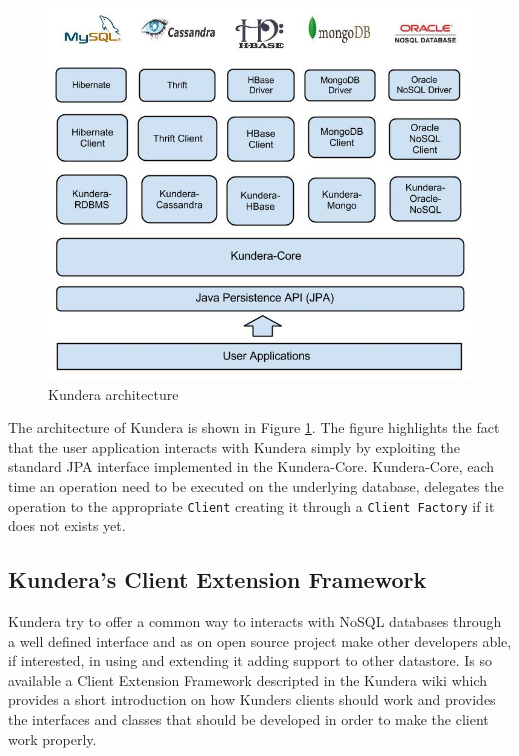 \begin{figure}[tbh]
  \centering
  \includegraphics[scale=0.5]{images/kundera_architecture}
  \caption{Kundera architecture}
  \label{fig:kundera_architecture}
\end{figure}

\newparagraph The architecture of Kundera is shown in Figure \ref{fig:kundera_architecture}. The figure highlights the fact that the user application interacts with Kundera simply by exploiting the standard JPA interface implemented in the Kundera-Core.
Kundera-Core, each time an operation need to be executed on the underlying database, delegates the operation to the appropriate \texttt{Client} creating it through a \texttt{Client Factory} if it does not exists yet.

\subsection{Kundera's Client Extension Framework}
Kundera try to offer a common way to interacts with NoSQL databases through a well defined interface and as on open source project make other developers able, if interested, in using and extending it adding support to other datastore.
Is so available a Client Extension Framework descripted in the Kundera wiki which provides a short introduction on how Kunders clients should work and provides the interfaces and classes that should be developed in order to make the client work properly.

